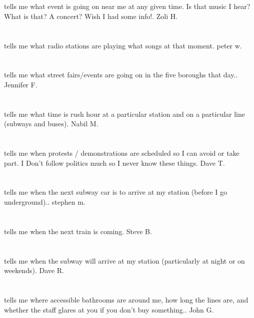 \section{}tells me what event is going on near me at any given time. Is that music I hear? What is that? A concert? Wish I had some info!. Zoli H.
\section{} tells me what radio stations are playing what songs at that moment. peter w.
\section{}tells me what street fairs/events are going on in the five boroughs that day.. Jennifer F.
\section{}tells me what time is rush hour at a particular station and on a particular line (subways and buses). Nabil M.
\section{} tells me when protests / demonstrations are scheduled so I can avoid or take part. I Don't follow politics much so I never know these things. Dave T.
\section{}tells me when the next subway car is to arrive at my station (before I go underground).. stephen m.
\section{}tells me when the next train is coming. Steve B.
\section{}tells me when the subway will arrive at my station (particularly at night or on weekends). Dave R.
\section{}tells me where accessible bathrooms are around me,  how long the lines are,  and whether the staff glares at you if you don't buy something.. John G.
